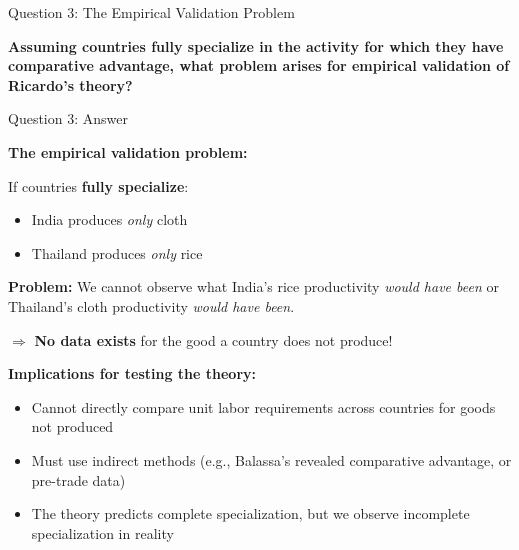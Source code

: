 \documentclass{beamer}
\begin{document}
\begin{frame}{Question 3: The Empirical Validation Problem}

\textbf{Assuming countries fully specialize in the activity for which they have comparative advantage, what problem arises for empirical validation of Ricardo's theory?}

\end{frame}


\begin{frame}{Question 3: Answer}

\textbf{The empirical validation problem:}

\vspace{0.3cm}

If countries \textbf{fully specialize}:
\begin{itemize}
    \item India produces \textit{only} cloth
    \item Thailand produces \textit{only} rice
\end{itemize}

\vspace{0.3cm}

\textbf{Problem:} We cannot observe what India's rice productivity \textit{would have been} or Thailand's cloth productivity \textit{would have been}.

\vspace{0.3cm}

$\Rightarrow$ \textbf{No data exists} for the good a country does not produce!

\vspace{0.5cm}

\textbf{Implications for testing the theory:}
\begin{itemize}
    \item Cannot directly compare unit labor requirements across countries for goods not produced
    \item Must use indirect methods (e.g., Balassa's revealed comparative advantage, or pre-trade data)
    \item The theory predicts complete specialization, but we observe incomplete specialization in reality
\end{itemize}

\end{frame}


\end{document}
